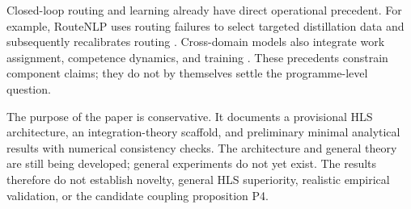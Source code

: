 Closed-loop routing and learning already have direct operational precedent. For example, RouteNLP uses routing failures to select targeted distillation data and subsequently recalibrates routing \citep{guo2026routenlp}. Cross-domain models also integrate work assignment, competence dynamics, and training \citep{borgonjon2024dynamic}. These precedents constrain component claims; they do not by themselves settle the programme-level question.

The purpose of the paper is conservative. It documents a provisional HLS architecture, an integration-theory scaffold, and preliminary minimal analytical results with numerical consistency checks. The architecture and general theory are still being developed; general experiments do not yet exist. The results therefore do not establish novelty, general HLS superiority, realistic empirical validation, or the candidate coupling proposition P4.
